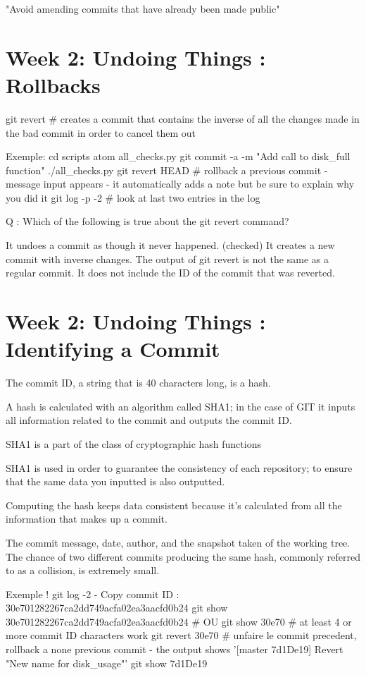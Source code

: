 \documentclass[11pt, onecolumn]{article}
\begin{document}
"Avoid amending commits that have already been made public"


\section{Week 2: Undoing Things : Rollbacks}


git revert    # creates a commit that contains the inverse of  all the changes made in the bad commit in order to cancel them out

Exemple:
cd scripts
atom all_checks.py
git commit -a -m "Add call to disk_full function"
./all_checks.py
git revert HEAD  # rollback a previous commit
- message input appears - it automatically adds a note but be sure to explain why you did it
git log -p -2 # look at last two entries in the log


Q : Which of the following is true about the git revert command?

It undoes a commit as though it never happened.
(checked) It creates a new commit with inverse changes.
The output of git revert is not the same as a regular commit.
It does not include the ID of the commit that was reverted.


\section{Week 2: Undoing Things : Identifying a Commit}

The commit ID, a string that is 40 characters long, is a hash.

A hash is calculated with an algorithm called SHA1; in the case of GIT it inputs all information related to the commit and outputs the commit ID. 

SHA1 is a part of the class of cryptographic hash functions
 
SHA1 is used in order to  guarantee the consistency of each repository; to ensure that the same data you inputted is also outputted. 

Computing the hash keeps data consistent because it's calculated from all the information that makes up a commit. 

The commit message, date, author, and the snapshot taken of the working tree. The chance of two different commits producing the same hash, commonly referred to as a collision, is extremely small. 

Exemple !
git log -2
- Copy commit ID : 30e701282267ca2dd749acfa02ea3aacfd0b24
git show 30e701282267ca2dd749acfa02ea3aacfd0b24
# OU
git show 30e70 # at least 4 or more commit ID characters work
git revert 30e70  # unfaire le commit precedent, rollback a none previous commit
- the output shows '[master 7d1De19] Revert "New name for disk_usage"'
git show 7d1De19
\end{document}

